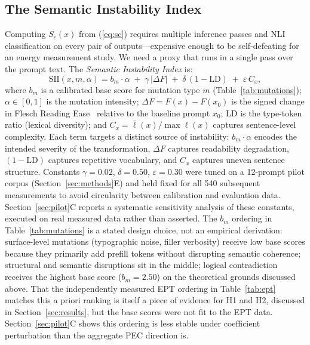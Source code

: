 \documentclass[conference]{IEEEtran}
\begin{document}
\subsection{The Semantic Instability Index}
Computing $S_c(x)$ from (\ref{eq:sc}) requires multiple inference
passes and NLI classification on every pair of outputs---expensive
enough to be self-defeating for an energy measurement study. We need a
proxy that runs in a single pass over the prompt text. The
\emph{Semantic Instability Index} is:
\begin{equation}
  \mathrm{SII}(x, m, \alpha) =
    b_m \cdot \alpha \;+\; \gamma\,|\Delta F| \;+\;
    \delta\,(1 - \mathrm{LD}) \;+\; \varepsilon\,C_x,
  \label{eq:sii}
\end{equation}
where $b_m$ is a calibrated base score for mutation type $m$
(Table~\ref{tab:mutations}); $\alpha \in [0,1]$ is the mutation
intensity; $\Delta F = F(x) - F(x_0)$ is the signed change in Flesch
Reading Ease~\cite{flesch1948readability} relative to the baseline
prompt $x_0$; LD is the type-token ratio (lexical diversity); and
$C_x = \bar{\ell}(x) / \max \ell(x)$ captures sentence-level
complexity. Each term targets a distinct source of instability: $b_m
\cdot \alpha$ encodes the intended severity of the transformation,
$\Delta F$ captures readability degradation, $(1-\mathrm{LD})$
captures repetitive vocabulary, and $C_x$ captures uneven sentence
structure. Constants $\gamma = 0.02$, $\delta = 0.50$,
$\varepsilon = 0.30$ were tuned on a 12-prompt pilot corpus
(Section~\ref{sec:methods}E) and held fixed for all 540 subsequent
measurements to avoid circularity between calibration and evaluation
data. Section~\ref{sec:pilot}C reports a systematic sensitivity
analysis of these constants, executed on real measured data rather
than asserted.
The $b_m$ ordering in Table~\ref{tab:mutations} is a stated design
choice, not an empirical derivation: surface-level mutations
(typographic noise, filler verbosity) receive low base scores because
they primarily add prefill tokens without disrupting semantic
coherence; structural and semantic disruptions sit in the middle;
logical contradiction receives the highest base score ($b_m = 2.50$)
on the theoretical grounds discussed above. That the independently
measured EPT ordering in Table~\ref{tab:ept} matches this a priori
ranking is itself a piece of evidence for H1 and H2, discussed in
Section~\ref{sec:results}, but the base scores were not fit to the EPT
data. Section~\ref{sec:pilot}C shows this ordering is less stable
under coefficient perturbation than the aggregate PEC direction is.
\end{document}
